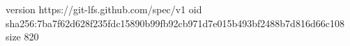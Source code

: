 version https://git-lfs.github.com/spec/v1
oid sha256:7ba7f62d628f235fdc15890b99fb92cb971d7e015b493bf2488b7d816d66c108
size 820
